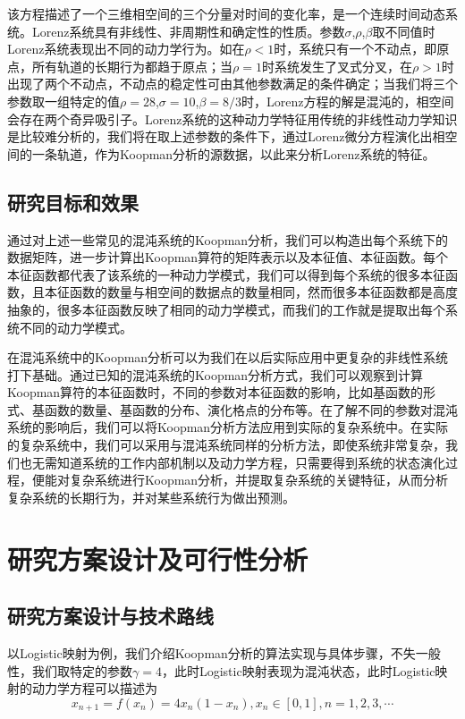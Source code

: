 该方程描述了一个三维相空间的三个分量对时间的变化率，是一个连续时间动态系统。Lorenz系统具有非线性、非周期性和确定性的性质。参数$\sigma$,$\rho$,$\beta$取不同值时Lorenz系统表现出不同的动力学行为。如在$\rho<1$时，系统只有一个不动点，即原点，所有轨道的长期行为都趋于原点；当$\rho=1$时系统发生了叉式分叉，在$\rho>1$时出现了两个不动点，不动点的稳定性可由其他参数满足的条件确定；当我们将三个参数取一组特定的值$\rho=28$,$\sigma=10$,$\beta=8/3$时，Lorenz方程的解是混沌的，相空间会存在两个奇异吸引子。Lorenz系统的这种动力学特征用传统的非线性动力学知识是比较难分析的，我们将在取上述参数的条件下，通过Lorenz微分方程演化出相空间的一条轨道，作为Koopman分析的源数据，以此来分析Lorenz系统的特征。


\subsection{研究目标和效果}

通过对上述一些常见的混沌系统的Koopman分析，我们可以构造出每个系统下的数据矩阵，进一步计算出Koopman算符的矩阵表示以及本征值、本征函数。每个本征函数都代表了该系统的一种动力学模式，我们可以得到每个系统的很多本征函数，且本征函数的数量与相空间的数据点的数量相同，然而很多本征函数都是高度抽象的，很多本征函数反映了相同的动力学模式，而我们的工作就是提取出每个系统不同的动力学模式。

在混沌系统中的Koopman分析可以为我们在以后实际应用中更复杂的非线性系统打下基础。通过已知的混沌系统的Koopman分析方式，我们可以观察到计算Koopman算符的本征函数时，不同的参数对本征函数的影响，比如基函数的形式、基函数的数量、基函数的分布、演化格点的分布等。在了解不同的参数对混沌系统的影响后，我们可以将Koopman分析方法应用到实际的复杂系统中。在实际的复杂系统中，我们可以采用与混沌系统同样的分析方法，即使系统非常复杂，我们也无需知道系统的工作内部机制以及动力学方程，只需要得到系统的状态演化过程，便能对复杂系统进行Koopman分析，并提取复杂系统的关键特征，从而分析复杂系统的长期行为，并对某些系统行为做出预测。

\section{研究方案设计及可行性分析}
\subsection{研究方案设计与技术路线}
以Logistic映射为例，我们介绍Koopman分析的算法实现与具体步骤，不失一般性，我们取特定的参数$\gamma=4$，此时Logistic映射表现为混沌状态，此时Logistic映射的动力学方程可以描述为
$$x_{n+1}=f(x_n)=4x_n(1-x_n),x_n\in [0,1],n=1,2,3,\cdots$$

